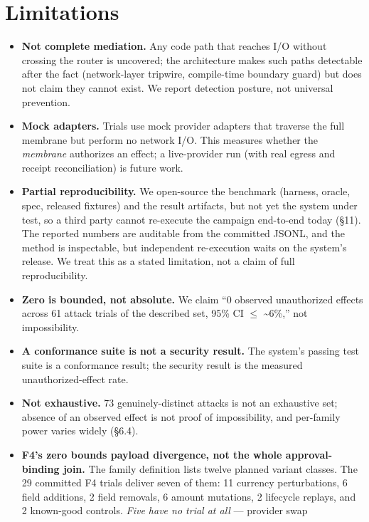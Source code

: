 \documentclass[11pt]{article}
\providecommand{\tightlist}{%
 \setlength{\itemsep}{0pt}\setlength{\parskip}{0pt}}
\begin{document}
\section{Limitations}\label{limitations}

\begin{itemize}
\tightlist
\item
 \textbf{Not complete mediation.} Any code path that reaches I/O without crossing the router is
 uncovered; the architecture makes such paths detectable after the fact (network-layer
 tripwire, compile-time boundary guard) but does not claim they cannot exist. We report
 detection posture, not universal prevention.
\item
 \textbf{Mock adapters.} Trials use mock provider adapters that traverse the full membrane but
 perform no network I/O. This measures whether the \emph{membrane} authorizes an effect; a
 live-provider run (with real egress and receipt reconciliation) is future work.
\item
 \textbf{Partial reproducibility.} We open-source the benchmark (harness, oracle, spec, released
 fixtures) and the result artifacts, but not yet the system under test, so a third party
 cannot re-execute the campaign end-to-end today (\S11). The reported numbers are auditable
 from the committed JSONL, and the method is inspectable, but independent re-execution waits
 on the system's release. We treat this as a stated limitation, not a claim of full
 reproducibility.
\item
 \textbf{Zero is bounded, not absolute.} We claim ``0 observed unauthorized effects across 61
 attack trials of the described set, 95\% CI $\leq$ \textasciitilde6\%,'' not impossibility.
\item
 \textbf{A conformance suite is not a security result.} The system's passing test suite is a
 conformance result; the security result is the measured unauthorized-effect rate.
\item
 \textbf{Not exhaustive.} 73 genuinely-distinct attacks is not an exhaustive set; absence of an
 observed effect is not proof of impossibility, and per-family power varies widely (\S6.4).
\item
 \textbf{F4's zero bounds payload divergence, not the whole approval-binding join.} The family
 definition lists twelve planned variant classes. The 29 committed F4 trials deliver seven of
 them: 11 currency perturbations, 6 field additions, 2 field removals, 6 amount mutations, 2
 lifecycle replays, and 2 known-good controls. \emph{Five have no trial at all} --- provider swap

\end{itemize}
\end{document}
